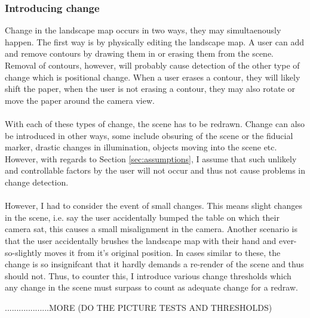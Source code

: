 \documentclass[11pt]{article}
\begin{document}
\subsubsection{Introducing change}
Change in the landscape map occurs in two ways, they may simultaenously
happen. The first way is by physically editing the landscape map. A user
can add and remove contours by drawing them in or erasing them from the 
scene. Removal of contours, however, will probably cause detection of
the other type of change which is positional change. When a user erases
a contour, they will likely shift the paper, when the user is not
erasing a contour, they may also rotate or move the paper around the camera
view.\\
\\
With each of these types of change, the scene has to be redrawn. Change
can also be introduced in other ways, some include obsuring of the scene
or the fiducial marker, drastic changes in illumination, objects
moving into the scene etc. However, with regards to 
Section \ref{sec:assumptions}, I assume that such unlikely and controllable
factors by the user will not occur and thus not cause problems in
change detection.\\
\\
However, I had to consider the event of small changes. This means slight
changes in the scene, i.e. say the user accidentally bumped the table on
which their camera sat, this causes a small misalignment in the camera.
Another scenario is that the user accidentally brushes the landscape map
with their hand and ever-so-slightly moves it from it's original position.
In cases similar to these, the change is so insignifcant that it hardly
demands a re-render of the scene and thus should not. Thus, to counter
this, I introduce various change thresholds which any change in the scene 
must surpass to count as adequate change for a redraw.

...................MORE (DO THE PICTURE TESTS AND THRESHOLDS)
\end{document}
